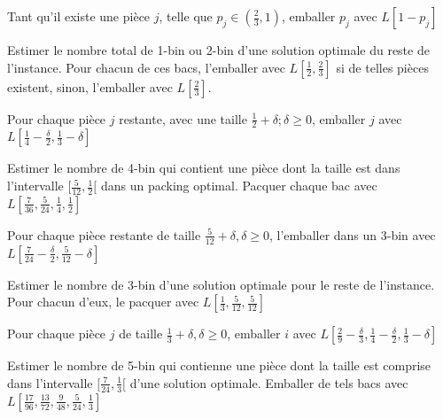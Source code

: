 \documentclass[a4paper,12pt]{report}
\theoremstyle{plain}				%
\theoremstyle{definition}				%
\begin{document}
\begin{algorithm}[H]
\DontPrintSemicolon

Tant qu'il existe une pièce $j$, telle que $p_j \in (\frac{2}{3},1)$,
emballer $p_j$ avec $L[1-p_j]$

\BlankLine %
Estimer le nombre total de 1-bin ou 2-bin d'une solution optimale du
reste de l'instance.
Pour chacun de ces bacs, l'emballer avec $L[\frac{1}{2}, \frac{2}{3}]$
si de telles pièces existent, sinon, l'emballer avec $L[\frac{2}{3}]$.

\BlankLine %

\BlankLine %
Pour chaque pièce $j$ restante, avec une taille $\frac{1}{2}+\delta;
\delta \geq 0$, emballer $j$ avec $L[\frac{1}{4}-\frac{\delta}{2},
\frac{1}{3}-\delta]$

\BlankLine %
Estimer le nombre de 4-bin qui contient une pièce dont la taille est
dans l'intervalle $[\frac{5}{12}, \frac{1}{2}[$ dans un packing
optimal. Pacquer chaque bac avec $L[ \frac{7}{36}, \frac{5}{24},
\frac{1}{4}, \frac{1}{2}]$

Pour chaque pièce restante de taille
$\frac{5}{12}+\delta, \delta \geq 0$, l'emballer dans un 3-bin avec
$L[\frac{7}{24}-\frac{\delta}{2}, \frac{5}{12}-\delta]$

\BlankLine %
Estimer le nombre de 3-bin d'une solution optimale pour le reste de
l'instance. Pour chacun d'eux, le pacquer avec $L[\frac{1}{3},
\frac{5}{12}, \frac{5}{12}]$

\BlankLine %

Pour chaque pièce $j$ de taille $\frac{1}{3}+\delta, \delta \geq 0$,
emballer $i$
avec $L[\frac{2}{9}-\frac{\delta}{3},
        \frac{1}{4}-\frac{\delta}{2},
        \frac{1}{3}-\delta]$

\BlankLine %
Estimer le nombre de 5-bin qui contienne une pièce
dont la taille est comprise dans l'intervalle
$[\frac{7}{24},\frac{1}{3}[$ d'une solution optimale.
Emballer de tels bacs avec
$L[\frac{17}{96},
   \frac{13}{72},
   \frac{9}{48},
   \frac{5}{24},
   \frac{1}{3}]$


\end{algorithm}
\end{document}
